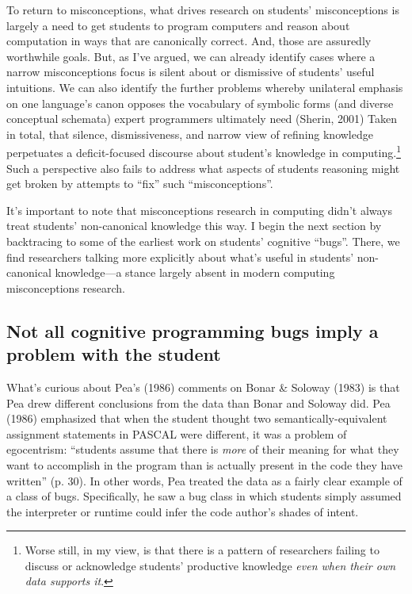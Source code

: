 To return to misconceptions, what drives research on students'
misconceptions is largely a need to get students to program computers
and reason about computation in ways that are canonically correct. And,
those are assuredly worthwhile goals. But, as I've argued, we can
already identify cases where a narrow misconceptions focus is silent
about or dismissive of students' useful intuitions. We can also identify
the further problems whereby unilateral emphasis on one language's canon
opposes the vocabulary of symbolic forms (and diverse conceptual
schemata) expert programmers ultimately need (Sherin, 2001) Taken in
total, that silence, dismissiveness, and narrow view of refining
knowledge perpetuates a deficit-focused discourse about student's
knowledge in computing.\footnote{Worse still, in my view, is that there
  is a pattern of researchers failing to discuss or acknowledge
  students' productive knowledge \emph{even when their own data supports
  it}.} Such a perspective also fails to address what aspects of
students reasoning might get broken by attempts to ``fix'' such
``misconceptions''.

It's important to note that misconceptions research in computing didn't
always treat students' non-canonical knowledge this way. I begin the
next section by backtracing to some of the earliest work on students'
cognitive ``bugs''. There, we find researchers talking more explicitly
about what's useful in students' non-canonical knowledge---a stance
largely absent in modern computing misconceptions research.

\subsection{Not all cognitive programming bugs imply a problem with
the
student}\label{not-all-cognitive-programming-bugs-imply-a-problem-with-the-student}

What's curious about Pea's (1986) comments on Bonar \& Soloway (1983) is
that Pea drew different conclusions from the data than Bonar and Soloway
did. Pea (1986) emphasized that when the student thought two
semantically-equivalent assignment statements in PASCAL were different,
it was a problem of egocentrism: ``students assume that there is
\emph{more} of their meaning for what they want to accomplish in the
program than is actually present in the code they have written'' (p.
30). In other words, Pea treated the data as a fairly clear example of a
class of bugs. Specifically, he saw a bug class in which students simply
assumed the interpreter or runtime could infer the code author's shades
of intent.

